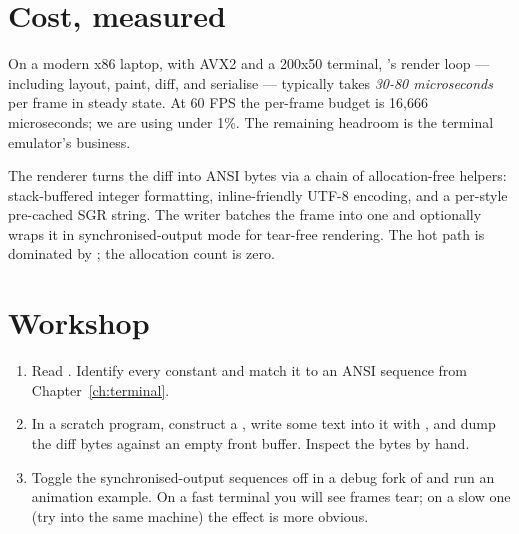 \section{Cost, measured}

On a modern x86 laptop, with AVX2 and a 200x50 terminal, \maya{}'s
render loop --- including layout, paint, diff, and serialise ---
typically takes \emph{30-80 microseconds} per frame in steady state.
At 60 FPS the per-frame budget is 16,666 microseconds; we are using
under 1\%. The remaining headroom is the terminal emulator's
business.

\begin{recap}
The renderer turns the diff into ANSI bytes via a chain of
allocation-free helpers: stack-buffered integer formatting,
inline-friendly UTF-8 encoding, and a per-style pre-cached SGR
string. The writer batches the frame into one  and
optionally wraps it in synchronised-output mode for tear-free
rendering. The hot path is dominated by ; the
allocation count is zero.
\end{recap}

\section*{Workshop}

\begin{enumerate}[leftmargin=*]
  \item Read . Identify
    every  constant and match it to an
    ANSI sequence from Chapter~\ref{ch:terminal}.
  \item In a scratch program, construct a , write some
    text into it with , and dump the diff bytes
    against an empty front buffer. Inspect the bytes by hand.
  \item Toggle the synchronised-output sequences off in a debug
    fork of \maya{} and run an animation example. On a fast
    terminal you will see frames tear; on a slow one (try
     into the same machine) the effect is
    more obvious.
\end{enumerate}
